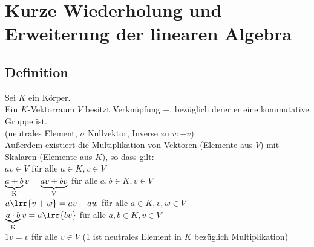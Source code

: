 \newpage
\section{Kurze Wiederholung und Erweiterung der linearen Algebra}
\subsection{Definition}
	Sei $K$ ein Körper.\\
	Ein $K$-Vektorraum $V$ besitzt Verknüpfung $+$, bezüglich derer er eine kommutative Gruppe ist.\\
	(neutrales Element, $\sigma$ Nullvektor, Inverse zu $v:-v$)\\
	Außerdem existiert die Multiplikation von Vektoren (Elemente aus $V$) mit Skalaren (Elemente aus $K$), so dass gilt:\\
	$av\in V$ für alle $a\in K, v\in V$\\
	$\underbrace{a+b}_{\mbox{\scriptsize K}}v=\underbrace{av+bv}_{\mbox{\scriptsize V}}$ für alle $a,b\in K, v\in V$\\
	$a\lrr{v+w}=av+aw$ für alle $a\in K,v,w\in V$\\
	$\underbrace{a\cdot b}_{\mbox{\scriptsize K}}v=a\lrr{bv}$ für alle $a,b\in K, v\in V$\\
	$1v=v$ für alle $v\in V$ (1 ist neutrales Element in $K$ bezüglich Multiplikation)

